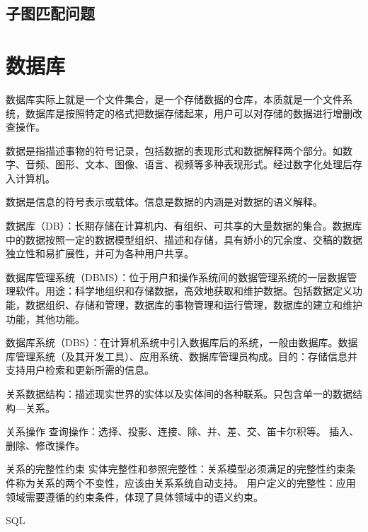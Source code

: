 \subsection{子图匹配问题}

\section{数据库}
数据库实际上就是一个文件集合，是一个存储数据的仓库，本质就是一个文件系统，数据库是按照特定的格式把数据存储起来，用户可以对存储的数据进行增删改查操作。

数据是指描述事物的符号记录，包括数据的表现形式和数据解释两个部分。如数字、音频、图形、文本、图像、语言、视频等多种表现形式。经过数字化处理后存入计算机。

数据是信息的符号表示或载体。信息是数据的内涵是对数据的语义解释。

数据库（DB）：长期存储在计算机内、有组织、可共享的大量数据的集合。数据库中的数据按照一定的数据模型组织、描述和存储，具有娇小的冗余度、交稿的数据独立性和易扩展性，并可为各种用户共享。

数据库管理系统（DBMS）：位于用户和操作系统间的数据管理系统的一层数据管理软件。用途：科学地组织和存储数据，高效地获取和维护数据。包括数据定义功能，数据组织、存储和管理，数据库的事物管理和运行管理，数据库的建立和维护功能，其他功能。

数据库系统（DBS）：在计算机系统中引入数据库后的系统，一般由数据库。数据库管理系统（及其开发工具）、应用系统、数据库管理员构成。目的：存储信息并支持用户检索和更新所需的信息。

关系数据结构：描述现实世界的实体以及实体间的各种联系。只包含单一的数据结构—关系。

关系操作
查询操作：选择、投影、连接、除、并、差、交、笛卡尔积等。
插入、删除、修改操作。

关系的完整性约束
实体完整性和参照完整性：关系模型必须满足的完整性约束条件称为关系的两个不变性，应该由关系系统自动支持。
用户定义的完整性：应用领域需要遵循的约束条件，体现了具体领域中的语义约束。


SQL

